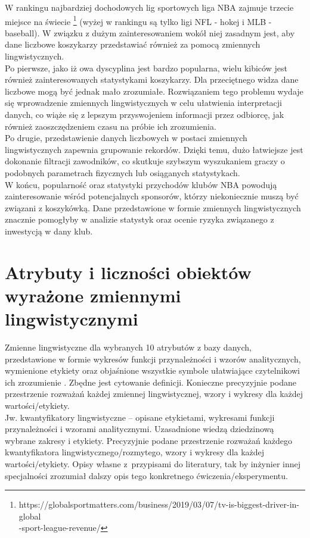 \documentclass{classrep}
\begin{document}
 W rankingu najbardziej dochodowych lig sportowych liga NBA zajmuje trzecie miejsce na świecie 
 \footnote {https://globalsportmatters.com/business/2019/03/07/tv-is-biggest-driver-in-global\\-sport-league-revenue/}
(wyżej w rankingu są tylko ligi NFL - hokej i MLB - baseball). W związku z dużym zainteresowaniem wokół niej zasadnym jest, aby dane liczbowe koszykarzy przedstawiać również za pomocą zmiennych lingwistycznych. \\
 \indent Po pierwsze, jako iż owa dyscyplina jest bardzo popularna, wielu kibiców jest również zainteresowanych statystykami koszykarzy. Dla przeciętnego widza dane liczbowe mogą być jednak mało zrozumiałe. Rozwiązaniem tego problemu wydaje się wprowadzenie zmiennych lingwistycznych w celu ułatwienia interpretacji danych, co wiąże się z lepszym przyswojeniem informacji przez odbiorcę, jak również zaoszczędzeniem czasu na próbie ich zrozumienia. \\
 \indent Po drugie, przedstawienie danych liczbowych w postaci zmiennych lingwistycznych zapewnia grupowanie rekordów. Dzięki temu, dużo łatwiejsze jest dokonanie filtracji zawodników, co skutkuje szybszym wyszukaniem graczy o podobnych parametrach fizycznych lub osiąganych statystykach.\\
 \indent W końcu, popularność oraz statystyki przychodów klubów NBA powodują zainteresowanie wśród potencjalnych sponsorów, którzy niekoniecznie muszą być związani z koszykówką. Dane przedstawione w formie zmiennych lingwistycznych znacznie pomogłyby w analizie statystyk oraz ocenie ryzyka związanego z inwestycją w dany klub. 

\section{Atrybuty i liczności obiektów wyrażone zmiennymi lingwistycznymi}
Zmienne lingwistyczne dla wybranych 10 atrybutów z bazy danych, przedstawione w
formie wykresów funkcji przynależności i wzorów analitycznych, wymienione etykiety oraz objaśnione wszystkie
symbole ułatwiające czytelnikowi ich zrozumienie \cite{zadrozny06}. Zbędne jest
cytowanie definicji. Konieczne precyzyjnie podane przestrzenie rozważań każdej
zmiennej lingwistycznej, wzory i wykresy dla każdej wartości/etykiety.\\
Jw. kwantyfikatory lingwistyczne -- opisane etykietami, wykresami funkcji
przynależności i wzorami analitycznymi. Uzasadnione wiedzą dziedzinową wybrane
zakresy i etykiety. Precyzyjnie podane przestrzenie rozważań każdego kwantyfikatora 
lingwistycznego/rozmytego, wzory i wykresy dla każdej wartości/etykiety. Opisy własne z~przypisami do literatury, tak by inżynier innej specjalności zrozumiał dalszy
opis tego konkretnego ćwiczenia/eksperymentu. \\ 
\end{document}
